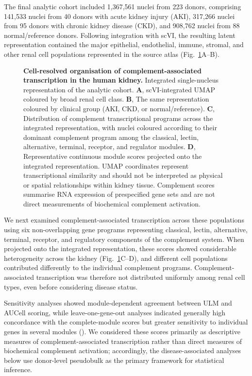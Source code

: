 \documentclass[10pt,letterpaper]{article}
\begin{document}
The final analytic cohort included 1,367,561 nuclei from 223 donors, comprising 141,533 nuclei from 40 donors with acute kidney injury (AKI), 317,266 nuclei from 95 donors with chronic kidney disease (CKD), and 908,762 nuclei from 88 normal/reference donors. Following integration with scVI, the resulting latent representation contained the major epithelial, endothelial, immune, stromal, and other renal cell populations represented in the source atlas (Fig.~\ref{fig:cell_atlas}A--B).

\begin{figure}[!h]
\caption{\textbf{Cell-resolved organisation of complement-associated transcription in the human kidney.}
Integrated single-nucleus representation of the analytic cohort. \textbf{A}, scVI-integrated UMAP coloured by broad renal cell class. \textbf{B}, The same representation coloured by clinical group (AKI, CKD, or normal/reference). \textbf{C}, Distribution of complement transcriptional programs across the integrated representation, with nuclei coloured according to their dominant complement program among the classical, lectin, alternative, terminal, receptor, and regulator modules. \textbf{D}, Representative continuous module scores projected onto the integrated representation. UMAP coordinates represent transcriptional similarity and should not be interpreted as physical or spatial relationships within kidney tissue. Complement scores summarise RNA expression of prespecified gene sets and are not direct measurements of biochemical complement activation.}
\label{fig:cell_atlas}
\end{figure}


We next examined complement-associated transcription across these populations using six non-overlapping gene programs representing classical, lectin, alternative, terminal, receptor, and regulatory components of the complement system. When projected onto the integrated representation, these scores showed considerable heterogeneity across the kidney (Fig.~\ref{fig:cell_atlas}C--D), and different cell populations contributed differently to the individual complement programs. Complement-associated transcription was therefore not distributed uniformly among renal cell types, even before considering disease status.

Sensitivity analyses showed module-dependent agreement between ULM and AUCell scoring, while leave-one-gene-out analyses indicated generally high concordance with the complete-module scores but greater sensitivity to individual genes in several modules (). We considered these scores primarily as descriptive measures of complement-associated transcription rather than direct measures of biochemical complement activation; accordingly, the disease-associated analyses below use donor-level pseudobulk as the primary framework for statistical inference.
\end{document}
